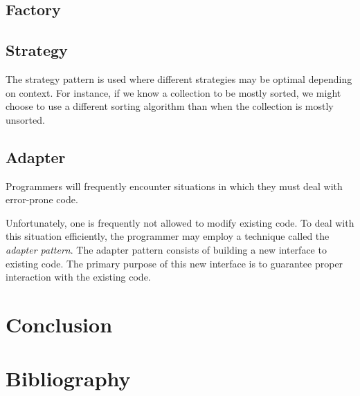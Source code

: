 \documentclass{article}
\begin{document}
\subsection{Factory}
\subsection{Strategy}
The strategy pattern is used where different strategies may be optimal depending on context.
For instance, if we know a collection to be mostly sorted, we might choose to use a different sorting algorithm than when the collection is mostly unsorted.


\subsection{Adapter}
Programmers will frequently encounter situations in which they must deal with error-prone code.

Unfortunately, one is frequently not allowed to modify existing code.
To deal with this situation efficiently, the programmer may employ a technique called the {\em adapter pattern}.
The adapter pattern consists of building a new interface to existing code.
The primary purpose of this new interface is to guarantee proper interaction with the existing code.

\newpage

\section{Conclusion}


\section{Bibliography}


\fi
\end{document}
